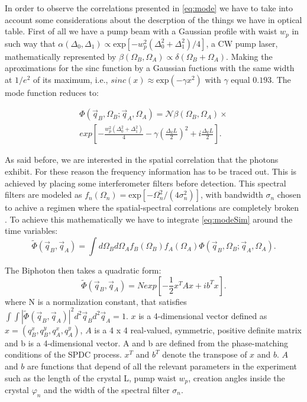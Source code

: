 In order to observe the correlations presented in \ref{eq:mode} we have to take into account some considerations about the descrption of the things we have in optical table.
First of all we have a pump beam with a Gaussian profile with waist $w_p$ 
in such way that $\alpha (\Delta_0,\Delta_1 ) \propto \text{exp}[-w_p^2 (\Delta_0^2 + \Delta_1^2 )/4]$, a CW pump laser, mathematically represented by
$\beta (\Omega_B , \Omega_A) \propto \delta(\Omega_B + \Omega_A)$. Making the aproximations for the sinc function by a Gaussian fuctions with the same width at $1/e^2$ of its maximum,
i.e., $sinc(x) \approx \text{exp}(-\gamma x^2)$ with $\gamma$ equal $0.193$.
The mode function reduces to:

\begin{equation}\label{eq:modeSim}
\begin{split}
\Phi(\vec{q}_B,\Omega_B;\vec{q}_A,\Omega_A) = \mathcal{N} \beta (\Omega_B , \Omega_A)
\times \\ \textit{exp}\left[ -\frac{w_p^2 (\Delta_0^2 + \Delta_1^2 )}{4}-\gamma \left(\frac{\Delta_k L}{2} \right)^2 + i\frac{\Delta_k L}{2} \right]  .
\end{split}
\end{equation}

As said before, we are interested in the spatial correlation that the photons 
exhibit. For these reason the frequency information has to be traced 
out. This is achieved by placing some interferometer filters before detection.
This spectral filters are modeled as $f_n (\Omega_n)=\text{exp}[-\Omega_n^2/(
4\sigma_n^2)]$, with bandwidth $\sigma_n$ chosen to achive a regimen where the 
spatial-spectral correlations are completely broken \cite{broke}. 
To achieve this mathematically we have to integrate \ref{eq:modeSim} around the
time variables:
\begin{equation}
\label{eq:modeSpa}
\tilde{\Phi}(\vec{q}_B,\vec{q}_A) = \int d\Omega_B d\Omega_A f_B(\Omega_B)f_A(\Omega_A) \Phi(\vec{q}_B,\Omega_B;\vec{q}_A,\Omega_A).
\end{equation}



The Biphoton then takes a quadratic form\cite{omar}:
\begin{equation}
\label{eq:quadratic}
\tilde{\Phi}(\vec{q}_B,\vec{q}_A)=N \textit{exp}\left[ -\frac{1}{2}x^T A x + i b^T x \right].
\end{equation}
where N is a normalization constant, that satisfies $\int \int | \tilde{\Phi}(\vec{q}_B,\vec{q}_A)|^2 d^2 \vec{q}_B d^2 \vec{q}_A = 1$. 
$x$ is a 4-dimensional vector defined as $x = (q^x_B, q^y_B ,q^x_A,q^y_A )$, $A$ 
is a 4 x 4 real-valued, symmetric, positive definite matrix and b is a 4-dimensional vector. 
A and b are defined from the phase-matching conditions of the SPDC process. $x^T$ and $b^T$ denote
 the transpose of $x$ and $b$. $A$ and $b$ are functions that depend of all the relevant 
parameters in the experiment such as the length of the crystal L, pump waist $w_p$, creation 
angles inside the crystal $\varphi_n$ and the width of the spectral filter $\sigma_n$.



